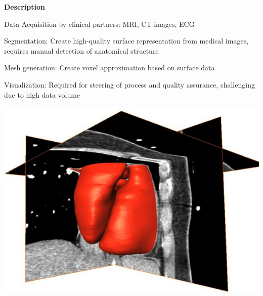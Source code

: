 \documentclass[20pt]{ICSPoster}
\begin{document}
\begin{posterbox}[2]
\begin{headerbox}[
        title=End-to-End Workflow,
        height=0.28\textheight,
        width=0.47\textwidth]
      \begin{minipage}{0.40\textwidth}\sf
        \textbf{Description}
        \begin{compactitem}
          \item Data Acquisition by clinical partners: MRI, CT images, ECG
          \item Segmentation: Create high-quality surface representation from medical images,
                requires manual detection of anatomical structure
          \item Mesh generation: Create voxel approximation based on surface data
          \item Visualization: Required for steering of process and quality assurance, challenging
                due to high data volume
        \end{compactitem}
      \end{minipage}
      \begin{minipage}{0.40\textwidth}\sf
        \hspace{2cm}\includegraphics[width=\textwidth]{AMIRA}
      \end{minipage}
    \end{headerbox}


\end{posterbox}
\end{document}
